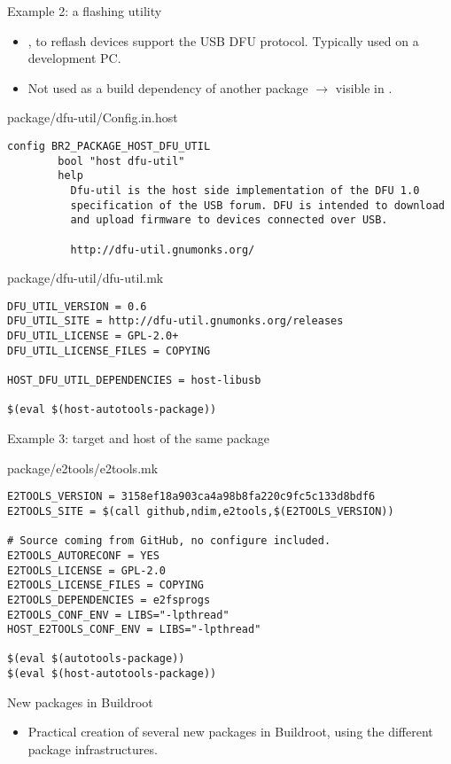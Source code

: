 \begin{frame}[fragile]{Example 2: a flashing utility}

  \begin{itemize}
  \item {}, to reflash devices support the USB DFU
    protocol. Typically used on a development PC.
  \item Not used as a build dependency of another package
    $\rightarrow$ visible in .
  \end{itemize}
  \begin{block}{package/dfu-util/Config.in.host}
    \tiny
\begin{verbatim}
config BR2_PACKAGE_HOST_DFU_UTIL
        bool "host dfu-util"
        help
          Dfu-util is the host side implementation of the DFU 1.0
          specification of the USB forum. DFU is intended to download
          and upload firmware to devices connected over USB.

          http://dfu-util.gnumonks.org/
\end{verbatim}
  \end{block}

  \begin{block}{package/dfu-util/dfu-util.mk}
    \begin{verbatim}
DFU_UTIL_VERSION = 0.6
DFU_UTIL_SITE = http://dfu-util.gnumonks.org/releases
DFU_UTIL_LICENSE = GPL-2.0+
DFU_UTIL_LICENSE_FILES = COPYING

HOST_DFU_UTIL_DEPENDENCIES = host-libusb

$(eval $(host-autotools-package))
    \end{verbatim}
  \end{block}
\end{frame}

\begin{frame}[fragile]{Example 3: target and host of the same package}
  \begin{block}{package/e2tools/e2tools.mk}
    \begin{verbatim}
E2TOOLS_VERSION = 3158ef18a903ca4a98b8fa220c9fc5c133d8bdf6
E2TOOLS_SITE = $(call github,ndim,e2tools,$(E2TOOLS_VERSION))

# Source coming from GitHub, no configure included.
E2TOOLS_AUTORECONF = YES
E2TOOLS_LICENSE = GPL-2.0
E2TOOLS_LICENSE_FILES = COPYING
E2TOOLS_DEPENDENCIES = e2fsprogs
E2TOOLS_CONF_ENV = LIBS="-lpthread"
HOST_E2TOOLS_CONF_ENV = LIBS="-lpthread"

$(eval $(autotools-package))
$(eval $(host-autotools-package))
    \end{verbatim}
  \end{block}
\end{frame}

\setuplabframe
{New packages in Buildroot}
{
  \begin{itemize}
  \item Practical creation of several new packages in Buildroot, using
    the different package infrastructures.
  \end{itemize}
}

